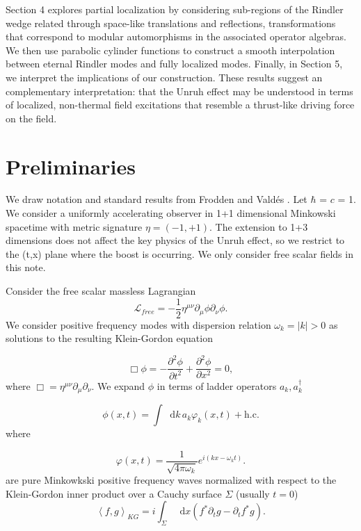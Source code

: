 \documentclass[12pt,a4paper]{article}
\newcommand*\diff{\mathop{}\!\mathrm{d}}
\begin{document}
Section 4 explores partial localization by considering sub-regions of the Rindler wedge related through space-like translations and reflections, transformations that correspond to modular automorphisms in the associated operator algebras. We then use parabolic cylinder functions to construct a smooth interpolation between eternal Rindler modes and fully localized modes. Finally, in Section 5, we interpret the implications of our construction. These results suggest an complementary interpretation: that the Unruh effect may be understood in terms of localized, non-thermal field excitations that resemble a thrust-like driving force on the field.

\section{Preliminaries}

We draw notation and standard results from Frodden and Vald{\'{e}}s \cite{frodden2018unruh}. Let $\hbar$ = $c$ = 1. We consider a uniformly accelerating observer in 1+1 dimensional Minkowski spacetime with metric signature $\eta=(-1,+1)$. The extension to 1+3 dimensions does not affect the key physics of the Unruh effect, so we restrict to the (t,x) plane where the boost is occurring.  We only consider free scalar fields in this note.

Consider the free scalar massless Lagrangian
\begin{equation}
\mathscr{L}_{free} = -\frac{1}{2} \eta^{\mu\nu}\partial_\mu \phi \partial_\nu \phi.
\end{equation}
We consider positive frequency modes with dispersion relation $\omega_k = |k| > 0$ as solutions to the resulting Klein-Gordon equation 

\begin{equation}
  \Box \phi = -\frac{\partial^2 \phi}{\partial t^2} + \frac{\partial^2 \phi}{\partial x^2} = 0,
 \label{massless-wave-eq}
\end{equation}
where $\Box = \eta^{\mu\nu} \partial_\mu \partial_\nu$. We expand $\phi$ in terms of ladder operators $a_k, a_k^\dagger$

\begin{equation}
  \phi(x,t) = \int \diff k \, a_k \varphi_k(x,t) + \text{h.c.}
\end{equation}
where

\begin{equation}
  \varphi(x,t) = \frac{1}{\sqrt{4\pi\omega_k}} e^{i(kx - \omega_k t)}.
\label{amode}
\end{equation}
are pure Minkowkski positive frequency waves normalized with respect to the Klein-Gordon inner product over a Cauchy surface $\Sigma$ (usually $t = 0$)
\begin{equation}
  \left<f, g\right>_{KG} = i \int_\Sigma \diff x (f^* \partial_t g - \partial_t f^* g).
\end{equation}
\end{document}
